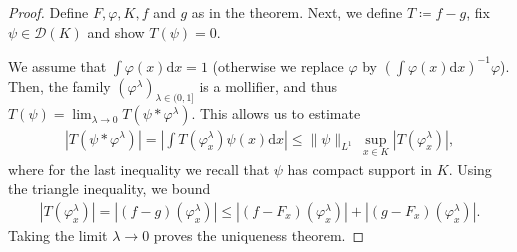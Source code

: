 \begin{proof}
    Define \(F, \varphi, K, f\) and \(g\) as in the theorem. Next, we define \(T \coloneqq f - g\), fix \(\psi \in \mathcal{D}(K)\) and show \(T(\psi) = 0\).
   
    We assume that \(\int \varphi(x) \mathrm{d} x = 1\) (otherwise we replace \(\varphi\) by \((\int \varphi(x) \mathrm{d}x)^{-1}\varphi\)). Then, the family \((\varphi^\lambda)_{\lambda \in (0,1]}\) is a mollifier, and thus \(T(\psi) = \lim_{\lambda \to 0}T(\psi * \varphi^\lambda)\). This allows us to estimate 
    \begin{align*}
        |T(\psi * \varphi^\lambda)| = \left|\int T(\varphi^\lambda_x) \psi(x) \mathrm{d}x\right| \leq \lVert \psi \rVert_{L^1} \, \sup_{x \in K}|T(\varphi^\lambda_x)|,
    \end{align*}
    where for the last inequality we recall that \(\psi\) has compact support in \(K\). Using the triangle inequality, we bound 
    \begin{align*}
        |T(\varphi^\lambda_x)| = |(f-g)(\varphi^\lambda_x)| \leq |(f-F_x)(\varphi^\lambda_x)| + |(g-F_x)(\varphi^\lambda_x)|.
    \end{align*}
    Taking the limit \(\lambda \to 0\) proves the uniqueness theorem. 
\end{proof}
